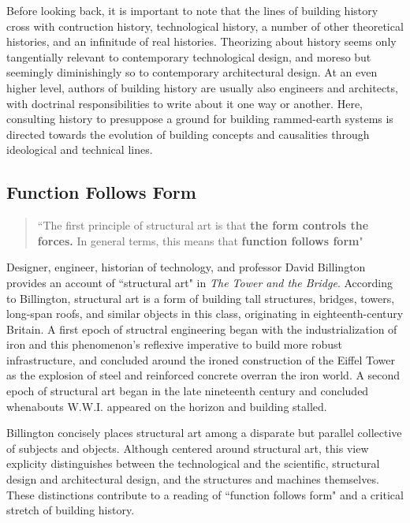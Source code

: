 Before looking back, it is important to note that the lines of building history cross with contruction history, technological history, a number of other theoretical histories, and an infinitude of real histories. Theorizing about history seems only tangentially relevant to contemporary technological design, and moreso but seemingly diminishingly so to contemporary architectural design. At an even higher level, authors of building history are usually also engineers and architects, with doctrinal responsibilities to write about it one way or another. \cite[p14]{CONSHISTORY} Here, consulting history to presuppose a ground for building rammed-earth systems is directed towards the evolution of building concepts and causalities through ideological and technical lines.

\clearpage

\subsection{Function Follows Form}

\begin{quote}
  ``The first principle of structural art is that {\large{\textbf{the form controls the forces.}}} In general terms, this means that {\large{\textbf{function follows form}}}" \cite[p87]{TOWERANDBRIDGE}
\end{quote}

Designer, engineer, historian of technology, and professor David Billington provides an account of ``structural art" in \textit{The Tower and the Bridge}.  According to Billington, structural art is a form of building tall structures, bridges, towers, long-span roofs, and similar objects in this class, originating in eighteenth-century Britain. A first epoch of structral engineering began with the industrialization of iron and this phenomenon's reflexive imperative to build more robust infrastructure, and concluded around the ironed construction of the Eiffel Tower as the explosion of steel and reinforced concrete overran the iron world. A second epoch of structural art began in the late nineteenth century and concluded whenabouts W.W.I. appeared on the horizon and building stalled. \cite[p7]{TOWERANDBRIDGE}

Billington concisely places structural art among a disparate but parallel collective of subjects and objects. Although centered around structural art, this view explicity distinguishes between the technological and the scientific, structural design and architectural design, and the structures and machines themselves. These distinctions contribute to a reading of ``function follows form" and a critical stretch of building history.

